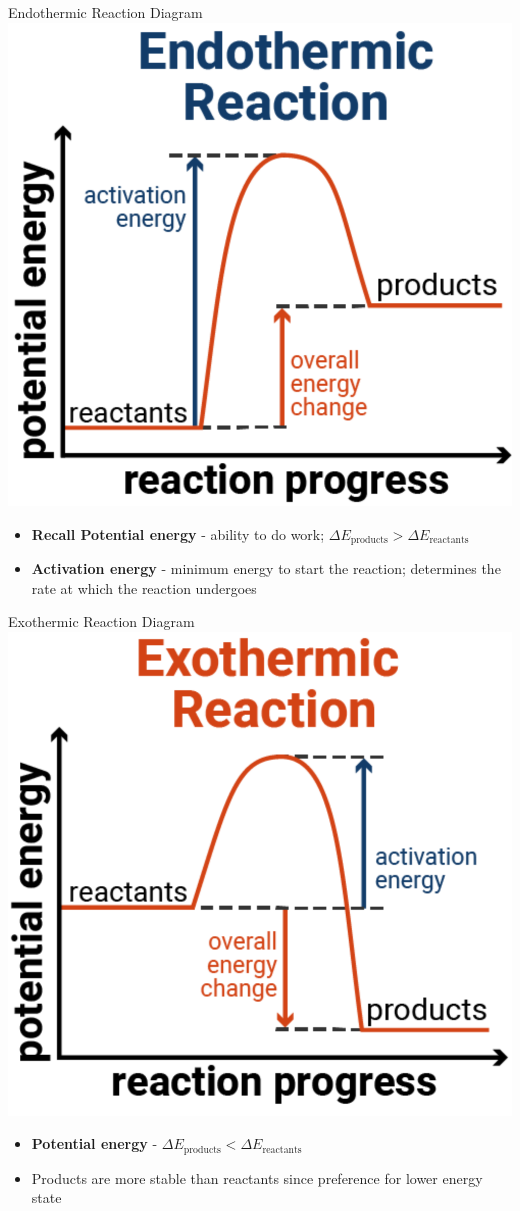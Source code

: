 \documentclass[11pt]{beamer}
\begin{document}
\begin{frame}{Endothermic Reaction Diagram}
  \centering
  \includegraphics[width=0.5\linewidth]{endo_rxn}

  \begin{itemize}
  \item \textbf{Recall Potential energy} - ability to do
    work; $\Delta E_\text{products} > \Delta E_\text{reactants}$
  \item \textbf{Activation energy} - minimum energy to start the
    reaction; determines the rate at which the reaction undergoes
  \end{itemize}
\end{frame}

\begin{frame}{Exothermic Reaction Diagram}
  \centering
  \includegraphics[width=0.5\linewidth]{exo_rxn}
  \begin{itemize}
  \item \textbf{Potential energy} - $\Delta E_\text{products} < \Delta E_\text{reactants}$
  \item Products are more stable than reactants since preference
    for lower energy state
  \end{itemize}
\end{frame}
\end{document}
